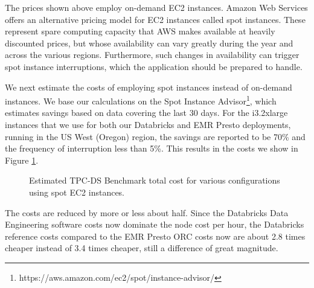 The prices shown above employ on-demand EC2 instances. Amazon Web Services offers an alternative pricing model for EC2 instances called spot instances. These represent spare computing capacity that AWS makes available at heavily discounted prices, but whose availability can vary greatly during the year and across the various regions. Furthermore, such changes in availability can trigger spot instance interruptions, which the application should be prepared to handle.

We next estimate the costs of employing spot instances instead of on-demand instances. We base our calculations on the Spot Instance Advisor\footnote{https://aws.amazon.com/ec2/spot/instance-advisor/}, which estimates savings based on data covering the last 30 days. For the i3.2xlarge instances that we use for both our Databricks and EMR Presto deployments, running in the US West (Oregon) region, the savings are reported to be 70\% and the frequency of interruption less than 5\%. This results in the costs we show in Figure \ref{fig:resultsSummaryTotalCostsWithDiscount}.

\begin{figure}
   \begin{center}
   \end{center}
   \caption{Estimated TPC-DS Benchmark total cost for various configurations using spot EC2 instances.}
   \label{fig:resultsSummaryTotalCostsWithDiscount}
\end{figure}

The costs are reduced by more or less about half. Since the Databricks Data Engineering software costs now dominate the node cost per hour, the Databricks reference costs compared to the EMR Presto ORC costs now are about 2.8 times cheaper instead of 3.4 times cheaper, still a difference of great magnitude.


